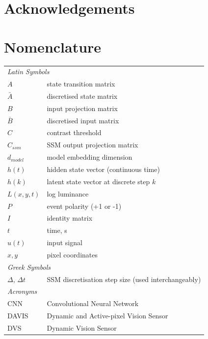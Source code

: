 \documentclass[11pt, a4paper]{report}
\begin{document}
\chapter*{Acknowledgements}

\tableofcontents
\clearpage{}
\listoffigures
\clearpage{}
\listoftables

\chapter*{Nomenclature}
\begin{tabular}{ll}
\multicolumn{2}{l}{\textit{Latin Symbols}} \\[4pt]
$A$ & state transition matrix \\
$\bar{A}$ & discretised state matrix \\
$B$ & input projection matrix \\
$\bar{B}$ & discretised input matrix \\
$C$ & contrast threshold \\
$C_{ssm}$ & SSM output projection matrix \\
$d_{model}$ & model embedding dimension \\
$h(t)$ & hidden state vector (continuous time) \\
$h(k)$ & latent state vector at discrete step $k$ \\
$L(x,y,t)$ & log luminance \\
$P$ & event polarity (+1 or -1) \\
$I$ & identity matrix \\
$t$ & time, s \\
$u(t)$ & input signal \\
$x, y$ & pixel coordinates \\[8pt]
\multicolumn{2}{l}{\textit{Greek Symbols}} \\[4pt]
$\Delta$, $\Delta t$ & SSM discretisation step size (used interchangeably) \\[8pt]
\multicolumn{2}{l}{\textit{Acronyms}} \\[4pt]
CNN & Convolutional Neural Network \\
DAVIS & Dynamic and Active-pixel Vision Sensor \\
DVS & Dynamic Vision Sensor \\

\end{tabular}
\end{document}

